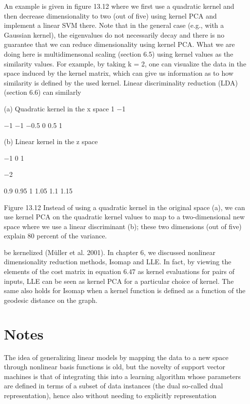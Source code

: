 An example is given in figure 13.12 where we first use a quadratic kernel and then decrease dimensionality to two (out of five) using kernel PCA and implement a linear SVM there. Note that in the general case (e.g., with a Gaussian kernel), the eigenvalues do not necessarily decay and there is no guarantee that we can reduce dimensionality using kernel PCA. What we are doing here is multidimensonal scaling (section 6.5) using kernel values as the similarity values. For example, by taking k = 2, one can visualize the data in the space induced by the kernel matrix, which can give us information as to how similarity is defined by the used kernel. Linear discriminality reduction (LDA) (section 6.6) can similarly

(a) Quadratic kernel in the x space 1 $-$1

$-$1 $-$1 $-$0.5 0 0.5 1

(b) Linear kernel in the z space

$-$1 0 1

$-$2

0.9 0.95 1 1.05 1.1 1.15

Figure 13.12 Instead of using a quadratic kernel in the original space (a), we can use kernel PCA on the quadratic kernel values to map to a two-dimensional new space where we use a linear discriminant (b); these two dimensions (out of five) explain 80 percent of the variance.

be kernelized (Müller et al. 2001). In chapter 6, we discussed nonlinear dimensionality reduction methods, Isomap and LLE. In fact, by viewing the elements of the cost matrix in equation 6.47 as kernel evaluations for pairs of inputs, LLE can be seen as kernel PCA for a particular choice of kernel. The same also holds for Isomap when a kernel function is defined as a function of the geodesic distance on the graph.

\section{Notes}

The idea of generalizing linear models by mapping the data to a new space through nonlinear basis functions is old, but the novelty of support vector machines is that of integrating this into a learning algorithm whose parameters are defined in terms of a subset of data instances (the dual so-called dual representation), hence also without needing to explicitly representation

